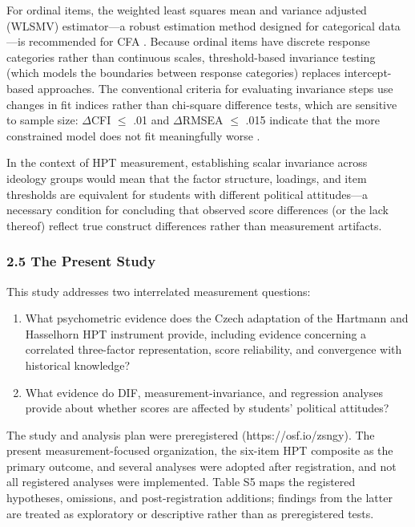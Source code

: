 \documentclass[
  12pt,
]{article}
\newcommand{\Loc}[1]{\linelabel{loc:#1}}
\newcommand{\LocEnd}[1]{\linelabel{loc:#1:end}}
\begin{document}
For ordinal items, the weighted least squares mean and variance
adjusted (WLSMV) estimator---a robust estimation method designed for
categorical data---is recommended for CFA \citep{Flora2004}.
Because ordinal items have discrete response categories rather than
continuous scales, threshold-based invariance testing (which models the
boundaries between response categories) replaces intercept-based
approaches. The conventional criteria for evaluating invariance steps use changes in fit indices rather than chi-square difference tests, which are sensitive to sample size: \(\Delta\)CFI \(\leq\) .01 and \(\Delta\)RMSEA \(\leq\) .015 indicate that the more constrained model does not fit meaningfully worse \citep{Chen2007,Cheung2002}.

In the context of HPT measurement, establishing scalar invariance across ideology groups would mean that the factor structure, loadings, and item thresholds are equivalent for students with different political attitudes---a necessary condition for concluding that observed score differences (or the lack thereof) reflect true construct differences rather than measurement artifacts.

\hypertarget{the-present-study}{%
\subsubsection{2.5 The Present Study}\label{the-present-study}}

\Loc{s25-rqs}This study addresses two interrelated measurement questions:

\begin{enumerate}
\def\labelenumi{\arabic{enumi}.}
\item[RQ1.]
  What psychometric evidence does the Czech adaptation of the Hartmann and Hasselhorn HPT instrument provide, including evidence concerning a correlated three-factor representation, score reliability, and convergence with historical knowledge?
\item[RQ2.]
  What evidence do DIF, measurement-invariance, and regression analyses provide about whether scores are affected by students' political attitudes?
\end{enumerate}

The study and analysis plan were preregistered
(https://osf.io/zsngy). The present
measurement-focused organization, the six-item HPT composite as the primary outcome, and several analyses were adopted
after registration, and not all registered analyses were implemented.
Table S5 maps the registered hypotheses, omissions, and
post-registration additions; findings from the latter are treated as
exploratory or descriptive rather than as preregistered tests.\LocEnd{s25-rqs}
\end{document}

